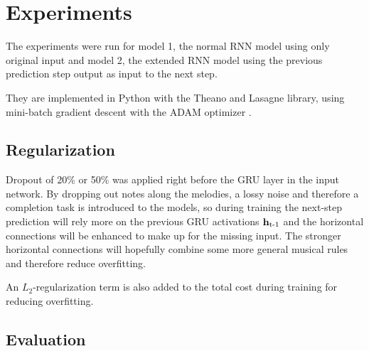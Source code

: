\section{Experiments}
\label{sec:experiments}


The experiments were run for model 1, the normal RNN model using only original input and model 2, the extended RNN model using the previous prediction step output as input to the next step.

They are implemented in Python with the Theano and Lasagne library, using mini-batch gradient descent with the ADAM optimizer \cite{Kingma2014c}.  

\subsection{Regularization} %
\label{sub:regularization}

Dropout of 20\% or 50\% was applied right before the GRU layer in the input network. By dropping out notes along the melodies, a lossy noise and therefore a completion task is introduced to the models, so during training the next-step prediction will rely more on the previous GRU activations $\bm{\mathrm{h}}_{\text{t-1}}$ and the horizontal connections will be enhanced to make up for the missing input. The stronger horizontal connections will hopefully combine some more general musical rules and therefore reduce overfitting. 

An $L_2$-regularization term is also added to the total cost during training for reducing overfitting.


\subsection{Evaluation}


